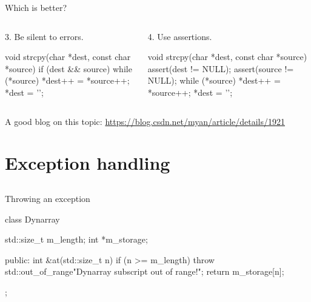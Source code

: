 \documentclass[aspectratio=169]{beamer}
\begin{document}
\begin{frame}[fragile]{Which is better?}
  \begin{columns}
    \begin{column}{0.5\textwidth}
      3. Be silent to errors.
      \begin{cpp}
void strcpy(char *dest, const char *source) {
  if (dest && source) {
    while (*source)
      *dest++ = *source++;
    *dest = '\0';
  }
}
      \end{cpp}
    \end{column}
    \begin{column}{0.5\textwidth}
      4. Use assertions.
      \begin{cpp}
void strcpy(char *dest, const char *source) {
  assert(dest != NULL);
  assert(source != NULL);
  while (*source)
    *dest++ = *source++;
  *dest = '\0';
}
      \end{cpp}
    \end{column}
  \end{columns}
  A good blog on this topic: \url{https://blog.csdn.net/myan/article/details/1921}
\end{frame}

\section{Exception handling}

\subsection{}

\begin{frame}[fragile]{Throwing an exception}
  \begin{cpp}[\small]
    class Dynarray {
      std::size_t m_length;
      int *m_storage;
    
    public:
      int &at(std::size_t n) {
        if (n >= m_length)
          throw std::out_of_range{"Dynarray subscript out of range!"};
        return m_storage[n];
      }
    };
  \end{cpp}
\end{frame}
\end{document}
